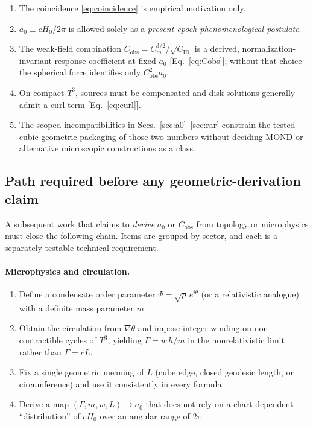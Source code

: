\documentclass[aps,prd,reprint,superscriptaddress,nofootinbib,floatfix,showkeys]{revtex4-2}
\newcommand{\Tthree}{T^{3}}
\newcommand{\Cobs}{C_{\mathrm{obs}}}
\newcommand{\Cm}{C_{m}}
\newcommand{\CIR}{C_{\mathrm{IR}}}
\newcommand{\azero}{a_{0}}
\newcommand{\Hzero}{H_{0}}
\begin{document}
\begin{enumerate}
\item The coincidence \eqref{eq:coincidence} is empirical motivation only.
\item \(\azero\equiv c\Hzero/2\pi\) is allowed solely as a
  \emph{present-epoch phenomenological postulate}.
\item The weak-field combination
  \(\Cobs=\Cm^{3/2}/\sqrt{\CIR}\) is a derived, normalization-invariant
  response coefficient at fixed \(\azero\) [Eq.~\eqref{eq:Cobs}]; without that
  choice the spherical force identifies only \(\Cobs^2\azero\).
\item On compact \(\Tthree\), sources must be compensated and disk solutions
  generally admit a curl term [Eq.~\eqref{eq:curl}].
\item The scoped incompatibilities in Secs.~\ref{sec:a0}--\ref{sec:rar}
  constrain the tested cubic geometric packaging of those two numbers without
  deciding MOND or alternative microscopic constructions as a class.
\end{enumerate}

\subsection{Path required before any geometric-derivation claim}

A subsequent work that claims to \emph{derive} \(\azero\) or \(\Cobs\) from
topology or microphysics must close the following chain.  Items are grouped
by sector, and each is a separately testable technical requirement.

\paragraph{Microphysics and circulation.}
\begin{enumerate}
\item[(M1)] Define a condensate order parameter
  \(\Psi=\sqrt{\rho}\,e^{i\theta}\)
  (or a relativistic analogue) with a definite mass parameter \(m\).
\item[(M2)] Obtain the circulation from \(\nabla\theta\) and impose integer
  winding on non-contractible cycles of \(\Tthree\), yielding
  \(\Gamma=w\,h/m\) in the nonrelativistic limit rather than \(\Gamma=cL\).
\item[(M3)] Fix a single geometric meaning of \(L\)
  (cube edge, closed geodesic length, or circumference) and use it
  consistently in every formula.
\item[(M4)] Derive a map
  \((\Gamma,m,w,L)\mapsto\azero\)
  that does not rely on a chart-dependent ``distribution'' of \(c\Hzero\) over
  an angular range of \(2\pi\).
\end{enumerate}
\end{document}
